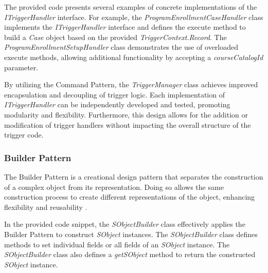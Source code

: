 \documentclass[12pt]{article}
\begin{document}
The provided code presents several examples of concrete implementations of the \textit{ITriggerHandler} interface. For example, the \textit{ProgramEnrollmentCaseHandler} class implements the \textit{ITriggerHandler} interface and defines the execute method to build a \textit{Case} object based on the provided \textit{TriggerContext.Record}. The \textit{ProgramEnrollmentSetupHandler} class demonstrates the use of overloaded execute methods, allowing additional functionality by accepting a \textit{courseCatalogId} parameter.

By utilizing the Command Pattern, the \textit{TriggerManager} class achieves improved encapsulation and decoupling of trigger logic. Each implementation of \textit{ITriggerHandler} can be independently developed and tested, promoting modularity and flexibility. Furthermore, this design allows for the addition or modification of trigger handlers without impacting the overall structure of the trigger code.

\subsubsection{Builder Pattern}
The Builder Pattern is a creational design pattern that separates the construction of a complex object from its representation. Doing so allows the same construction process to create different representations of the object, enhancing flexibility and reusability \cite{b1}.

In the provided code snippet, the \textit{SObjectBuilder} class effectively applies the Builder Pattern to construct \textit{SObject} instances. The \textit{SObjectBuilder} class defines methods to set individual fields or all fields of an \textit{SObject} instance. The \textit{SObjectBuilder} class also defines a \textit{getSObject} method to return the constructed \textit{SObject} instance.
\end{document}

